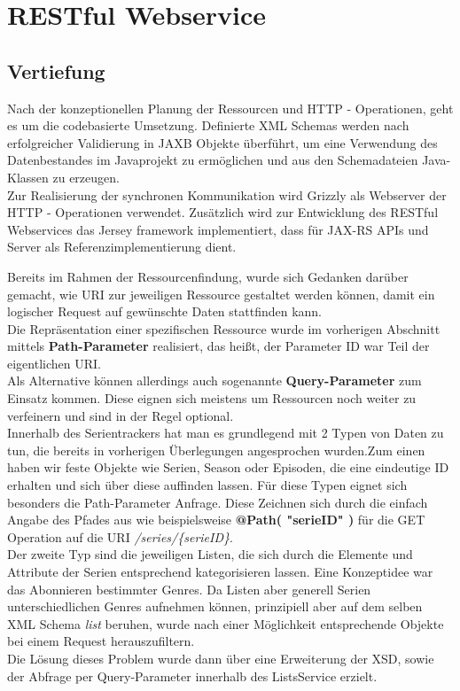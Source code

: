 
\section{RESTful Webservice}

\subsection{Vertiefung}

Nach der konzeptionellen Planung der Ressourcen und HTTP - Operationen, geht es um die codebasierte Umsetzung. Definierte XML Schemas werden nach erfolgreicher Validierung in JAXB Objekte überführt, um eine Verwendung des Datenbestandes im Javaprojekt zu ermöglichen und aus den Schemadateien Java-Klassen zu erzeugen.\\
Zur Realisierung der synchronen Kommunikation wird Grizzly als Webserver der HTTP - Operationen verwendet. Zusätzlich wird zur Entwicklung des RESTful Webservices das Jersey framework implementiert, dass für JAX-RS APIs und Server als Referenzimplementierung dient.\\

\vspace{0.2cm}


Bereits im Rahmen der Ressourcenfindung, wurde sich Gedanken darüber gemacht, wie URI zur jeweiligen Ressource gestaltet werden können, damit ein logischer Request auf gewünschte Daten stattfinden kann.\\

Die Repräsentation einer spezifischen Ressource wurde im vorherigen Abschnitt mittels \textbf{Path-Parameter} realisiert, das heißt, der Parameter ID war Teil der eigentlichen URI.\\
Als Alternative können allerdings auch sogenannte \textbf{Query-Parameter} zum Einsatz kommen. Diese eignen sich meistens um Ressourcen noch weiter zu verfeinern und sind in der Regel optional.\\

Innerhalb des Serientrackers hat man es grundlegend mit 2 Typen von Daten zu tun, die bereits in vorherigen Überlegungen angesprochen wurden.Zum einen haben wir feste Objekte wie Serien, Season oder Episoden, die eine eindeutige ID erhalten und sich über diese auffinden lassen. Für diese Typen eignet sich besonders die Path-Parameter Anfrage.
Diese Zeichnen sich durch die einfach Angabe des Pfades aus wie beispielsweise \textbf{@Path( "{serieID}" )} für die GET Operation auf die URI \textit{/series/\{serieID\}}.\\
Der zweite Typ sind die jeweiligen Listen, die sich durch die Elemente und Attribute der Serien entsprechend kategorisieren lassen. Eine Konzeptidee war das Abonnieren bestimmter Genres. Da Listen aber generell Serien unterschiedlichen Genres aufnehmen können, prinzipiell aber auf dem selben XML Schema \textit{list} beruhen, wurde nach einer Möglichkeit entsprechende Objekte bei einem Request herauszufiltern.\\ Die Lösung dieses Problem wurde dann über eine Erweiterung der XSD, sowie der Abfrage per Query-Parameter innerhalb des ListsService erzielt.


